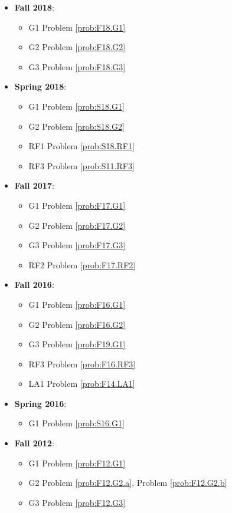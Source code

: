 \documentclass{article}
\theoremstyle{definition}
\begin{document}
\begin{itemize}
	\item \textbf{Fall 2018}: 
	\begin{itemize}
		\item G1 Problem \ref{prob:F18.G1}
		\item G2 Problem \ref{prob:F18.G2}
		\item G3 Problem \ref{prob:F18.G3}
	\end{itemize}
	\item \textbf{Spring 2018}:
	\begin{itemize}
		\item G1 Problem \ref{prob:S18.G1}
		\item G2 Problem \ref{prob:S18.G2}
		\item RF1 Problem \ref{prob:S18.RF1}
		\item RF3 Problem \ref{prob:S11.RF3}
	\end{itemize}
	\item \textbf{Fall 2017}:
	\begin{itemize}
		\item G1 Problem \ref{prob:F17.G1}
		\item G2 Problem \ref{prob:F17.G2}
		\item G3 Problem \ref{prob:F17.G3}
		\item RF2 Problem \ref{prob:F17.RF2}
	\end{itemize}
	\item \textbf{Fall 2016}:
	\begin{itemize}
		\item G1 Problem \ref{prob:F16.G1}
		\item G2 Problem \ref{prob:F16.G2}
		\item G3 Problem \ref{prob:F19.G1}
		\item RF3 Problem \ref{prob:F16.RF3}
		\item LA1 Problem \ref{prob:F14.LA1}
	\end{itemize}
	\item \textbf{Spring 2016}:
	\begin{itemize}
		\item G1 Problem \ref{prob:S16.G1}
	\end{itemize}
	\item \textbf{Fall 2012}:	
	\begin{itemize}
	\item G1 Problem \ref{prob:F12.G1} 
	\item G2 Problem \ref{prob:F12.G2.a}, Problem \ref{prob:F12.G2.b}
	\item G3 Problem \ref{prob:F12.G3}

\end{itemize}
\end{itemize}
\end{document}
